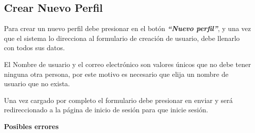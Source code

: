 \subsection{Crear Nuevo Perfil}
Para crear un nuevo perfil debe presionar en el botón \textbf{\textit{``Nuevo perfil''}}, y una vez que el sistema lo direcciona al formulario de creación de usuario, debe llenarlo con todos sus datos.

El Nombre de usuario y el correo electrónico son valores únicos que no debe tener ninguna otra persona, por este motivo es necesario que elija un nombre de usuario que no exista. 

Una vez cargado por completo el formulario debe presionar en enviar y será redireccionado a la página de inicio de sesión para que inicie sesión.

\textbf{Posibles errores}
